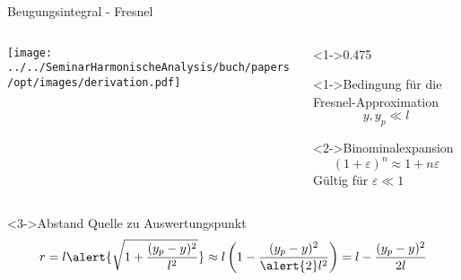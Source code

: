 \begin{frame}{Beugungsintegral - Fresnel}
    \begin{columns}
        \begin{column}[onlytextwidth]{0.475\textwidth}
            \centering
            \texttt{[image: ../../SeminarHarmonischeAnalysis/buch/papers/opt/images/derivation.pdf]}
        \end{column}

        \begin{column}[onlytextwidth]<1->{0.475\textwidth}
            \begin{alertblock}<1->{Bedingung für die Fresnel-Approximation}
                \begin{equation*}
                    y, y_p
                    \ll
                    l
                \end{equation*}
            \end{alertblock}
            \begin{block}<2->{Binominalexpansion}
                \begin{equation*}
                    (1 + \varepsilon)^n
                    \approx
                    1 + n\varepsilon
                \end{equation*}
                \centering
                Gültig für $\varepsilon \ll 1$
            \end{block}
        \end{column}
    \end{columns}
    \begin{block}<3->{Abstand Quelle zu Auswertungspunkt}
        \begin{equation*}
            r
            =
            l \alert{\sqrt{\normalcolor{1 + \frac{(y_p-y)^2}{l^2}}}}
            \approx
            l \left(1 - \frac{(y_p-y)^2}{\alert{2}l^2}\right)
            =
            l - \frac{(y_p-y)^2}{2l}
        \end{equation*}
    \end{block}
\end{frame}

